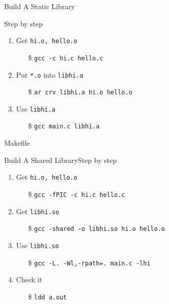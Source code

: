 \begin{frame}{Build A Static Library}
  \begin{minipage}{.45\linewidth}
    \begin{iblock}{Step by step}
      \begin{enumerate}
      \item Get \alert{\texttt{hi.o, hello.o}}
        \begin{itemize}
        \item[\$] \texttt{gcc -c hi.c hello.c}
        \end{itemize}
      \item Put \alert{\texttt{*.o}} into \alert{\texttt{libhi.a}}
        \begin{itemize}
        \item[\$] \texttt{ar crv libhi.a hi.o hello.o}
        \end{itemize}
      \item Use \alert{\texttt{libhi.a}}
        \begin{itemize}
        \item[\$] \texttt{gcc main.c libhi.a}
        \end{itemize}
      \end{enumerate}
    \end{iblock}
  \end{minipage}\quad
  \begin{minipage}{.5\linewidth}
    \begin{iblock}{Makefile}
    \end{iblock}
  \end{minipage}
\end{frame}

\begin{frame}{Build A Shared Library}{Step by step}
  \begin{enumerate}
  \item Get \alert{\texttt{hi.o, hello.o}}
    \begin{itemize}
    \item[\$] \texttt{gcc -fPIC -c hi.c hello.c}
    \end{itemize}
  \item Get \alert{\texttt{libhi.so}}
    \begin{itemize}
    \item[\$] \texttt{gcc -shared -o libhi.so hi.o hello.o}
    \end{itemize}
  \item Use \alert{\texttt{libhi.so}}
    \begin{itemize}
    \item[\$] \texttt{gcc -L. -Wl,-rpath=. main.c -lhi}
    \end{itemize}
  \item Check it
    \begin{itemize}
    \item[\$] \texttt{ldd a.out}
    \end{itemize}
  \end{enumerate}
\end{frame}

